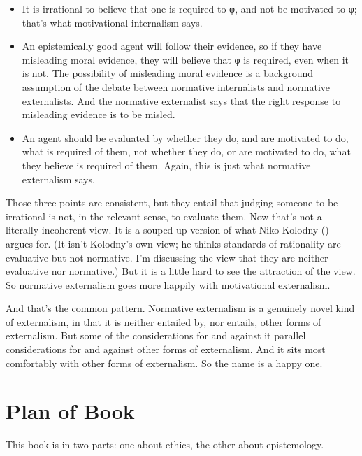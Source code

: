 \documentclass[
  10pt,
  letterpaper,
  twoside]{scrbook}
\providecommand{\tightlist}{%
  \setlength{\itemsep}{0pt}\setlength{\parskip}{0pt}}\usepackage{longtable,booktabs,array}
\begin{document}
\begin{itemize}
\tightlist
\item
  It is irrational to believe that one is required to φ, and not be
  motivated to φ; that's what motivational internalism says.
\item
  An epistemically good agent will follow their evidence, so if they
  have misleading moral evidence, they will believe that φ is required,
  even when it is not. The possibility of misleading moral evidence is a
  background assumption of the debate between normative internalists and
  normative externalists. And the normative externalist says that the
  right response to misleading evidence is to be misled.
\item
  An agent should be evaluated by whether they do, and are motivated to
  do, what is required of them, not whether they do, or are motivated to
  do, what they believe is required of them. Again, this is just what
  normative externalism says.
\end{itemize}

Those three points are consistent, but they entail that judging someone
to be irrational is not, in the relevant sense, to evaluate them. Now
that's not a literally incoherent view. It is a souped-up version of
what Niko Kolodny () argues for. (It
isn't Kolodny's own view; he thinks standards of rationality are
evaluative but not normative. I'm discussing the view that they are
neither evaluative nor normative.) But it is a little hard to see the
attraction of the view. So normative externalism goes more happily with
motivational externalism.

And that's the common pattern. Normative externalism is a genuinely
novel kind of externalism, in that it is neither entailed by, nor
entails, other forms of externalism. But some of the considerations for
and against it parallel considerations for and against other forms of
externalism. And it sits most comfortably with other forms of
externalism. So the name is a happy one.

\section{Plan of Book}\label{planofbook}

This book is in two parts: one about ethics, the other about
epistemology.
\end{document}
